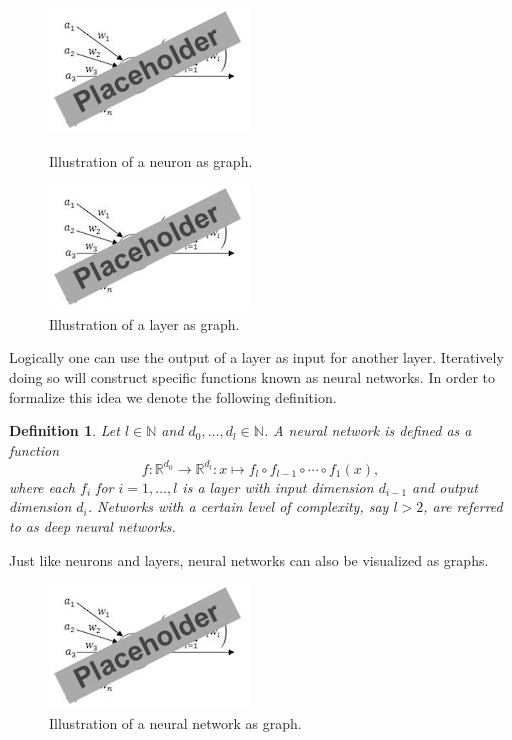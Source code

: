 \documentclass[11pt, a4paper]{article}
\newtheorem{definition}[theorem]{Definition}
\newcommand{\N}{\mathds{N}}
\newcommand{\R}{\mathds{R}}
\begin{document}
\begin{figure}[!h]
	\begin{minipage}[c]{0.5\linewidth}
	\centering
	\includegraphics{images/neuron.png}
      		\caption{Illustration of a neuron as graph.}
	\end{minipage}
	\hfill
	\begin{minipage}[c]{0.5\linewidth}
	\centering
	\includegraphics{images/neuron.png}
      		\caption{Illustration of a layer as graph.}
	\end{minipage}
\end{figure}

Logically one can use the output of a layer as input for another layer. Iteratively doing so will construct specific functions known as neural networks. In order to formalize this idea we denote the following definition. \\

\pagebreak
\begin{definition} \label{def:network}
Let $l \in \N$ and $d_0, \dots, d_l \in \N$. A neural network is defined as a function
\[ f : \R^{d_0} \to \R^{d_l} : x \mapsto f_l \circ f_{l-1} \circ \cdots \circ f_1 (x),\]
where each $f_i$ for $i=1, \dots, l$ is a layer with input dimension $d_{i-1}$ and output dimension $d_i$. Networks with a certain level of complexity, say $l>2$, are referred to as deep neural networks.
\end{definition}

Just like neurons and layers, neural networks can also be visualized as graphs.

\begin{figure}[!h]
\centering
\includegraphics{images/neuron.png}
\caption{Illustration of a neural network as graph.}
\label{fig:neuron}
\end{figure}  
\end{document}
